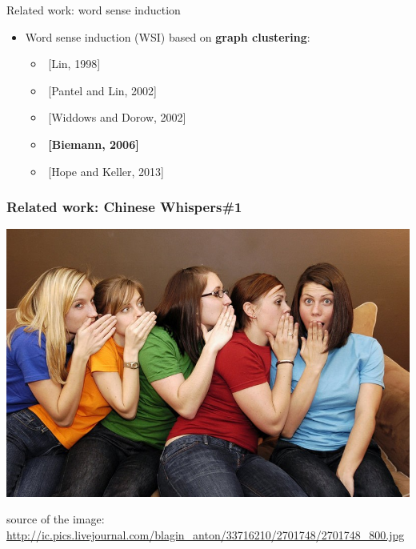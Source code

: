 \documentclass{beamer}
\begin{document}
\begin{frame}{Related work: word sense induction}

\begin{itemize}
	\item Word sense induction (WSI) based on \alert{\textbf{graph clustering}}:  
	\begin{itemize}
	\item $ $ [Lin, 1998]
	\item $ $ [Pantel and Lin, 2002]
	\item $ $ [Widdows and Dorow, 2002]
	\item $ $ \textbf{[Biemann, 2006]}
	\item $ $ [Hope and Keller, 2013]
	\end{itemize}
	
\end{itemize}
	

\end{frame}



\begin{frame}[fragile]
\frametitle{Related work: Chinese Whispers\#1}
\begin{center}
 \includegraphics[height=0.5\textwidth]{cw}
 
  {\tiny * source of the image: \url{http://ic.pics.livejournal.com/blagin_anton/33716210/2701748/2701748_800.jpg}}
 \end{center}
\end{frame}
\end{document}

